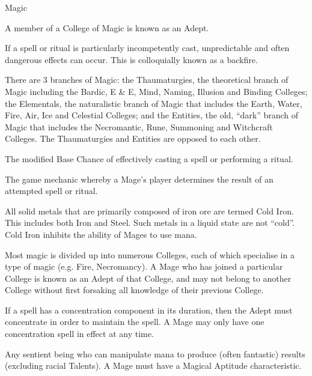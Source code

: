 \begin{Chapter}{Magic}
\begin{Description}
\item[Adept] A member of a College of Magic is known as an Adept.

\item[Backfire] If a spell or ritual is particularly incompetently
  cast, unpredictable and often dangerous effects can occur.  This is
  colloquially known as a backfire.

\item[Branches of Magic] There are 3 branches of Magic: the
  Thaumaturgies, the theoretical branch of Magic including the Bardic,
  E \& E, Mind, Naming, Illusion and Binding Colleges; the Elementals,
  the naturalistic branch of Magic that includes the Earth, Water,
  Fire, Air, Ice and Celestial Colleges; and the Entities, the old,
  “dark” branch of Magic that includes the Necromantic, Rune,
  Summoning and Witchcraft Colleges.  The Thaumaturgies and Entities
  are opposed to each other.

\item[Cast Chance] The modified Base Chance of effectively casting a
  spell or performing a ritual.

\item[Cast Check] The game mechanic whereby a Mage’s player determines
  the result of an attempted spell or ritual.

\item[Cold Iron] All solid metals that are primarily composed of iron
  ore are termed Cold Iron.  This includes both Iron and Steel. Such
  metals in a liquid state are not “cold”. Cold Iron inhibits the
  ability of Mages to use mana.

\item[College ] Most magic is divided up into numerous Colleges, each
  of which specialise in a type of magic (e.g.  Fire, Necromancy).  A
  Mage who has joined a particular College is known as an Adept of
  that College, and may not belong to another College without first
  forsaking all knowledge of their previous College.

\item[Concentration] If a spell has a concentration component in its
  duration, then the Adept must concentrate in order to maintain the
  spell.  A Mage may only have one concentration spell in effect at
  any time.

\item[Mage] Any sentient being who can manipulate mana to produce
  (often fantastic) results (excluding racial Talents). A Mage must
  have a Magical Aptitude characteristic.


\end{Description}
\end{Chapter}
